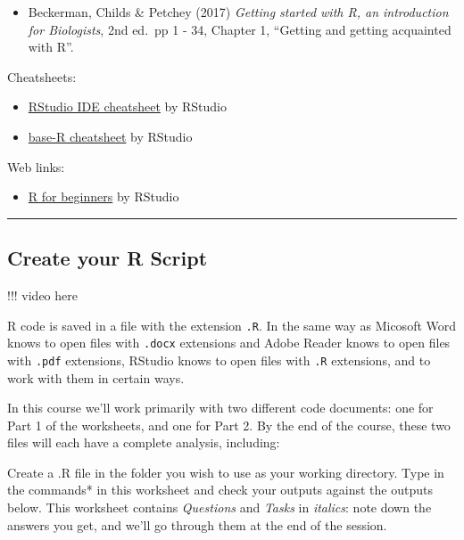 \documentclass[
]{book}
\providecommand{\tightlist}{%
  \setlength{\itemsep}{0pt}\setlength{\parskip}{0pt}}
\begin{document}
\begin{itemize}
\tightlist
\item
  Beckerman, Childs \& Petchey (2017) \emph{Getting started with R, an
  introduction for Biologists}, 2nd ed.~pp 1 - 34, Chapter 1, ``Getting and
  getting acquainted with R''.
  ~
\end{itemize}

Cheatsheets:

\begin{itemize}
\tightlist
\item
  \href{https://github.com/rstudio/cheatsheets/raw/master/rstudio-ide.pdf}{RStudio IDE cheatsheet} by RStudio
\item
  \href{http://github.com/rstudio/cheatsheets/raw/master/base-r.pdf}{base-R cheatsheet} by RStudio
  ~
\end{itemize}

Web links:

\begin{itemize}
\tightlist
\item
  \href{https://education.rstudio.com/learn/beginner}{R for beginners} by RStudio\\
  \hspace*{0.333em}
\end{itemize}

\begin{center}\rule{0.5\linewidth}{0.5pt}\end{center}

\hypertarget{create-your-r-script}{%
\subsection{Create your R Script}\label{create-your-r-script}}

!!! video here

R code is saved in a file with the extension \texttt{.R}. In the same way as Micosoft
Word knows to open files with \texttt{.docx} extensions and Adobe Reader knows to
open files with \texttt{.pdf} extensions, RStudio knows to open files with \texttt{.R}
extensions, and to work with them in certain ways.

In this course we'll work primarily with two different code documents: one
for Part 1 of the worksheets, and one for Part 2. By the end of the course,
these two files will each have a complete analysis, including:

Create a .R file in the folder you wish to use as your working directory. Type
in the commands* in this worksheet and check your outputs against the outputs
below. This worksheet contains \emph{Questions} and \emph{Tasks} in \emph{italics}: note
down the answers you get, and we'll go through them at the end of the session.
\end{document}
